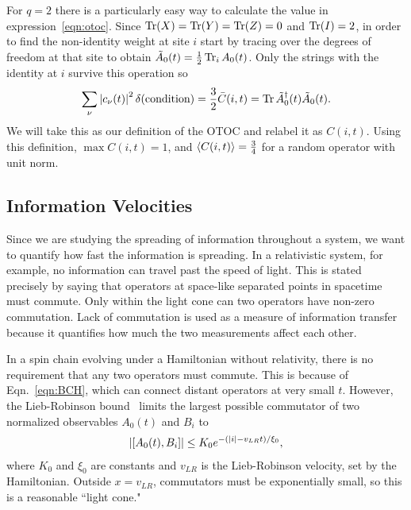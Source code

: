 For $q=2$ there is a particularly easy way to calculate the value in expression~\ref{eqn:otoc}. Since $\operatorname{Tr}(X) = \operatorname{Tr}(Y)=\operatorname{Tr}(Z) = 0$ and $\operatorname{Tr}(I) = 2$, in order to find the non-identity weight at site $i$ start by tracing over the degrees of freedom at that site to obtain $\tilde{A}_0(t) = \frac{1}{2}\operatorname{Tr}_iA_0(t)$. Only the strings with the identity at $i$ survive this operation so
\begin{align}
\sum_\nu \left|c_\nu(t)\right|^2\delta(\text{condition}) = \frac{3}{2}\bar{C}(i,t) =  \operatorname{Tr} 
	\tilde{A}^\dag_0(t)\tilde{A}_0(t).
\end{align}
We will take this as our definition of the OTOC and relabel it as $C(i,t)$. Using this definition, $\max C(i,t)=1$, and $\left\langle C(i,t) \right\rangle=\frac{3}{4}$ for a random operator with unit norm.

\subsection{Information Velocities} \label{sub:vels}

Since we are studying the spreading of information throughout a system, we want to quantify how fast the information is spreading. In a relativistic system, for example, no information can travel past the speed of light. This is stated precisely by saying that operators at space-like separated points in spacetime must commute. Only within the light cone can two operators have non-zero commutation. Lack of commutation is used as a measure of information transfer because it quantifies how much the two measurements affect each other.

In a spin chain evolving under a Hamiltonian without relativity, there is no requirement that any two operators must commute. This is because of Eqn.~\ref{eqn:BCH}, which can connect distant operators at very small $t$. However, the Lieb-Robinson bound~\cite{Lieb} limits the largest possible commutator of two normalized observables $A_0(t)$ and $B_i$ to
\begin{align}
\left|\left[A_0(t),B_i\right]\right|\le K_0 e^{-(\left|i\right|-v_{LR}t)/\xi_0},
\end{align}
where $K_0$ and $\xi_0$ are constants and $v_{LR}$ is the Lieb-Robinson velocity, set by the Hamiltonian. Outside $x=v_{LR}$, commutators must be exponentially small, so this is a reasonable ``light cone."


